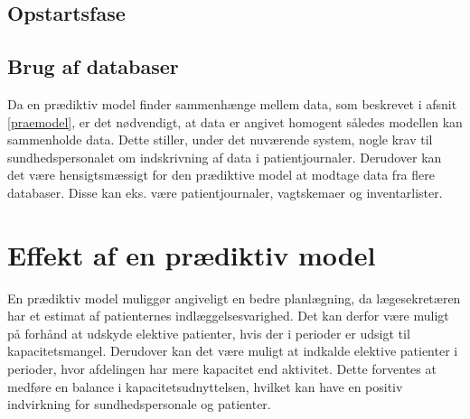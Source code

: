 \subsection{Opstartsfase}


\subsection{Brug af databaser}
Da en prædiktiv model finder sammenhænge mellem data, som beskrevet i afsnit \ref{praemodel}, er det nødvendigt, at data er angivet homogent således modellen kan sammenholde data\cite{Kuhn2013}. 
Dette stiller, under det nuværende system, nogle krav til sundhedspersonalet om indskrivning af data i patientjournaler. Derudover kan det være hensigtsmæssigt for den prædiktive model at modtage data fra flere databaser. Disse kan eks. være patientjournaler, vagtskemaer og inventarlister.





\section{Effekt af en prædiktiv model}
En prædiktiv model muliggør angiveligt en bedre planlægning, da lægesekretæren har et estimat af patienternes indlæggelsesvarighed.
Det kan derfor være muligt på forhånd at udskyde elektive patienter, hvis der i perioder er udsigt til kapacitetsmangel.
Derudover kan det være muligt at indkalde elektive patienter i perioder, hvor afdelingen har mere kapacitet end aktivitet. 
Dette forventes at medføre en balance i kapacitetsudnyttelsen, hvilket kan have en positiv indvirkning for sundhedspersonale og patienter. 

